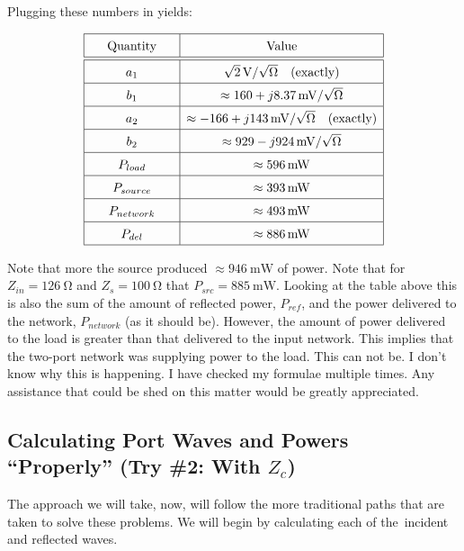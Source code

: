 Plugging these numbers in yields:

\[
        \def\arraystretch{1.5}
        \begin{array}{|c|c|}
            \hline \text{ \quad Quantity \quad } & \text{ \quad Value \quad }
            \\
            \hline \hline a_1 &
            \SI[parse-numbers=false]{\sqrt{2}}{\volt\per\sqrt{\ohm}}
            \text{\quad (exactly)} \\
            \hline b_1 & \approx \SI[parse-numbers=false]{160 + j 8.37}{\milli\volt\per\sqrt{\ohm}} \\
            \hline a_2 & \approx \SI[parse-numbers=false]{-166+j 143}{\milli\volt\per\sqrt{\ohm}} \text{\quad
        (exactly)} \\
        \hline b_2 & \approx \SI[parse-numbers=false]{929 -j 924}{\milli\volt\per\sqrt{\ohm}} \\ 
        \hline P_{load} & \approx \SI{596}{\milli\watt} \\
        \hline P_{source} & \approx \SI{393}{\milli\watt} \\
        \hline P_{network} & \approx \SI{493}{\milli\watt} \\ 
        \hline P_{del} & \approx \SI{886}{\milli\watt} \\ \hline
        \end{array}
\]

Note that more the source produced $\approx \SI{946}{\milli\watt}$ of power.
Note that for $Z_{in} = \SI{126}{\ohm}$ and $Z_s = \SI{100}{\ohm}$ that
$P_{src} = \SI{885}{\milli\watt}$. Looking at the table above this is also the
sum of the amount of reflected power, $P_{ref}$, and the power delivered to the
network, $P_{network}$ (as it should be). However, the amount of power delivered
to the load is greater than that delivered to the input network. This implies
that the two-port network was supplying power to the load. This can not be. I
don't know why this is happening. I have checked my formulae multiple times. Any
assistance that could be shed on this matter would be greatly appreciated. 

\subsection{Calculating Port Waves and Powers ``Properly'' (Try \#2: With $Z_c$)}

The approach we will take, now, will follow the more traditional paths that are
taken to solve these problems. We will begin by calculating each of the\ incident
and reflected waves.
